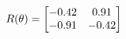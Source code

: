 \documentclass[preview]{standalone}
\begin{document}
\begin{align*}
\special{dvisvgm:raw <g id='unique000'>}R(\theta) = \begin{bmatrix}-0.42 & 0.91\\-0.91 & -0.42\end{bmatrix}\special{dvisvgm:raw </g>}
\end{align*}
\end{document}

